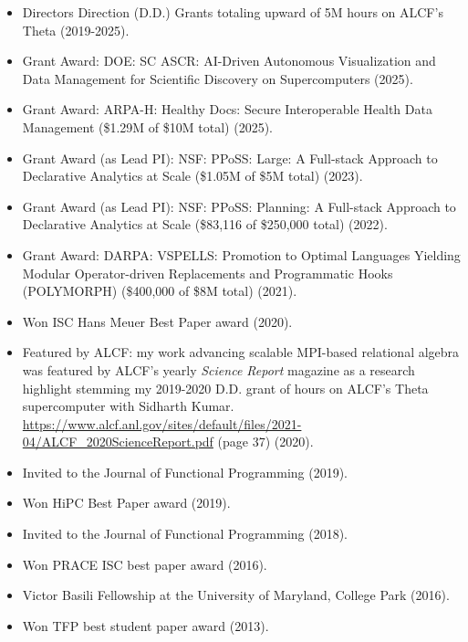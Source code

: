 \begin{itemize}
\item Directors Direction (D.D.) Grants totaling upward of 5M hours on ALCF's Theta (2019-2025).
\item Grant Award: DOE: SC ASCR: AI-Driven Autonomous Visualization and Data Management for Scientific Discovery on Supercomputers (2025).
\item Grant Award: ARPA-H: Healthy Docs: Secure Interoperable Health Data Management (\$1.29M of \$10M total) (2025).
\item Grant Award (as Lead PI): NSF: PPoSS: Large: A Full-stack Approach to Declarative Analytics at Scale (\$1.05M of \$5M total) (2023).
\item Grant Award (as Lead PI): NSF: PPoSS: Planning: A Full-stack Approach to Declarative Analytics at Scale (\$83,116 of \$250,000 total) (2022).
\item Grant Award: DARPA: VSPELLS: Promotion to Optimal Languages Yielding Modular Operator-driven Replacements and Programmatic Hooks (POLYMORPH) (\$400,000 of \$8M total) (2021).
\item Won ISC Hans Meuer Best Paper award (2020).
\item Featured by ALCF: my work advancing scalable MPI-based relational algebra was featured by ALCF's yearly \emph{Science Report} magazine as a research highlight stemming my 2019-2020 D.D. grant of hours on ALCF's Theta supercomputer with Sidharth Kumar. \url{https://www.alcf.anl.gov/sites/default/files/2021-04/ALCF_2020ScienceReport.pdf} (page 37) (2020).
\item Invited to the Journal of Functional Programming (2019).
\item Won HiPC Best Paper award (2019).
\item Invited to the Journal of Functional Programming (2018).
\item Won PRACE ISC best paper award (2016).
\item Victor Basili Fellowship at the University of Maryland, College Park (2016).
\item Won TFP best student paper award (2013).
\end{itemize}

